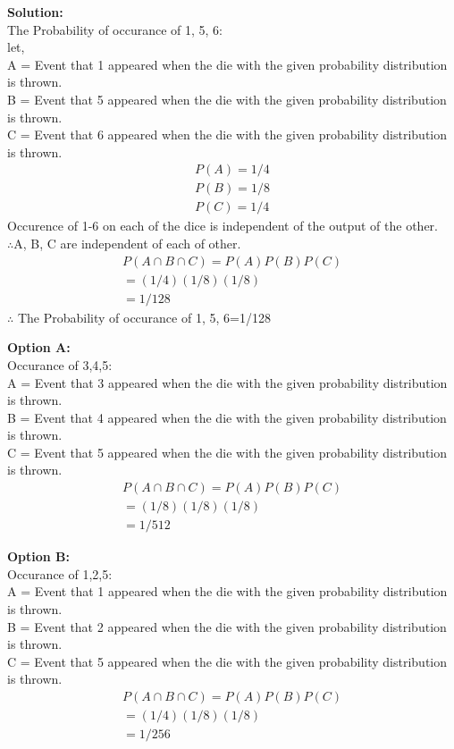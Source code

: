 \documentclass[journal]{IEEEtran}
\begin{document}
\textbf{Solution:}\\
The Probability of occurance of 1, 5, 6:\\
let,\\
A = Event that 1 appeared when the die with the given probability distribution is thrown.\\
B = Event that 5 appeared when the die with the given probability distribution is thrown.\\
C = Event that 6 appeared when the die with the given probability distribution is thrown.\\
\begin{align}
    P(A) = 1/4\\
    P(B) = 1/8\\
    P(C) =1/4
\end{align}
Occurence of 1-6 on each of the dice is independent of the output of the other.\\
$\therefore$A, B, C are independent of each of other.
\begin{align}
    P(A \cap B \cap C)=P(A) P(B)P(C)\\
    =(1/4)(1/8)(1/8)\\
    =1/128
\end{align}
$\therefore$ The Probability of occurance of 1, 5, 6=1/128

\textbf{Option A:}\\
Occurance of 3,4,5:\\
A = Event that 3 appeared when the die with the given probability distribution is thrown.\\
B = Event that 4 appeared when the die with the given probability distribution is thrown.\\
C = Event that 5 appeared when the die with the given probability distribution is thrown.\\
\begin{align}
    P(A \cap B \cap C)=P(A) P(B)P(C)\\
    =(1/8)(1/8)(1/8)\\
    =1/512
\end{align}

\textbf{Option B:}\\
Occurance of 1,2,5:\\
A = Event that 1 appeared when the die with the given probability distribution is thrown.\\
B = Event that 2 appeared when the die with the given probability distribution is thrown.\\
C = Event that 5 appeared when the die with the given probability distribution is thrown.\\
\begin{align}
    P(A \cap B \cap C)=P(A) P(B)P(C)\\
    =(1/4)(1/8)(1/8)\\
    =1/256
\end{align}
\end{document}
